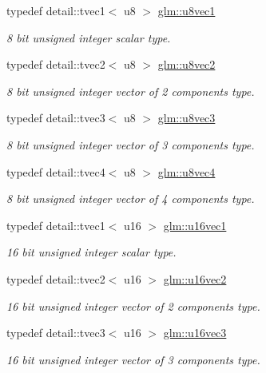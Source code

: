 \begin{DoxyCompactItemize}
typedef detail\-::tvec1$<$ u8 $>$ \hyperlink{group__gtc__type__precision_gac2309b4040a1432a8e1966b3a163b642}{glm\-::u8vec1}
\begin{DoxyCompactList}\small\item\em 8 bit unsigned integer scalar type. \end{DoxyCompactList}\item 
typedef detail\-::tvec2$<$ u8 $>$ \hyperlink{group__gtc__type__precision_gaa8ef8673b38c3442eb22bff54c5f0e00}{glm\-::u8vec2}
\begin{DoxyCompactList}\small\item\em 8 bit unsigned integer vector of 2 components type. \end{DoxyCompactList}\item 
typedef detail\-::tvec3$<$ u8 $>$ \hyperlink{group__gtc__type__precision_ga4dcca30d49842b1f4c919a0303944099}{glm\-::u8vec3}
\begin{DoxyCompactList}\small\item\em 8 bit unsigned integer vector of 3 components type. \end{DoxyCompactList}\item 
typedef detail\-::tvec4$<$ u8 $>$ \hyperlink{group__gtc__type__precision_ga165acf96e342bac32fe1dbf5bfd8a4e1}{glm\-::u8vec4}
\begin{DoxyCompactList}\small\item\em 8 bit unsigned integer vector of 4 components type. \end{DoxyCompactList}\item 
typedef detail\-::tvec1$<$ u16 $>$ \hyperlink{group__gtc__type__precision_gadfda7307e98ab4ab001bf16e8af84b64}{glm\-::u16vec1}
\begin{DoxyCompactList}\small\item\em 16 bit unsigned integer scalar type. \end{DoxyCompactList}\item 
typedef detail\-::tvec2$<$ u16 $>$ \hyperlink{group__gtc__type__precision_gac4edd601deebcb0c6406814aeb28edc5}{glm\-::u16vec2}
\begin{DoxyCompactList}\small\item\em 16 bit unsigned integer vector of 2 components type. \end{DoxyCompactList}\item 
typedef detail\-::tvec3$<$ u16 $>$ \hyperlink{group__gtc__type__precision_gadce584ceb1de400c392cb2df1b343df9}{glm\-::u16vec3}
\begin{DoxyCompactList}\small\item\em 16 bit unsigned integer vector of 3 components type. \end{DoxyCompactList}\item 

\end{DoxyCompactItemize}

